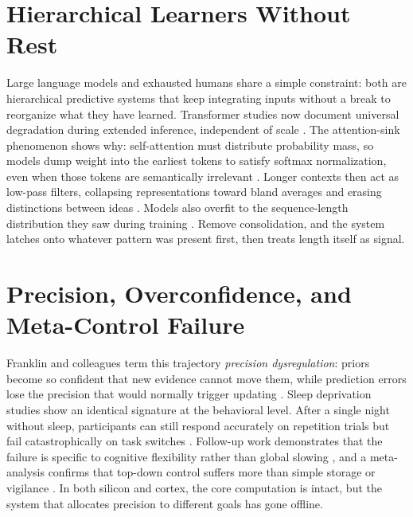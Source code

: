 \section{Hierarchical Learners Without Rest}\label{sec:hierarchical_without_rest}
Large language models and exhausted humans share a simple constraint: both are hierarchical predictive systems that keep
integrating inputs without a break to reorganize what they have learned. Transformer studies now document universal degradation
during extended inference, independent of scale \citep{patel2025multiturn}. The attention-sink phenomenon shows why: self-attention
must distribute probability mass, so models dump weight into the earliest tokens to satisfy softmax normalization, even when
those tokens are semantically irrelevant \citep{chen2023attention_sink}. Longer contexts then act as low-pass filters, collapsing
representations toward bland averages and erasing distinctions between ideas \citep{li2024lengthcollapse}. Models also overfit to the
sequence-length distribution they saw during training \citep{varis2021length}. Remove consolidation, and the system latches onto
whatever pattern was present first, then treats length itself as signal.

\section{Precision, Overconfidence, and Meta-Control Failure}\label{sec:precision_dysregulation}
Franklin and colleagues term this trajectory \textit{precision dysregulation}: priors become so confident that new evidence cannot
move them, while prediction errors lose the precision that would normally trigger updating \citep{franklin2023precision}. Sleep
deprivation studies show an identical signature at the behavioral level. After a single night without sleep, participants can still
respond accurately on repetition trials but fail catastrophically on task switches \citep{couyoumdjian2010}. Follow-up work demonstrates
that the failure is specific to cognitive flexibility rather than global slowing \citep{slama2018}, and a meta-analysis confirms that
top-down control suffers more than simple storage or vigilance \citep{garcia2021}. In both silicon and cortex, the core computation is
intact, but the system that allocates precision to different goals has gone offline.

